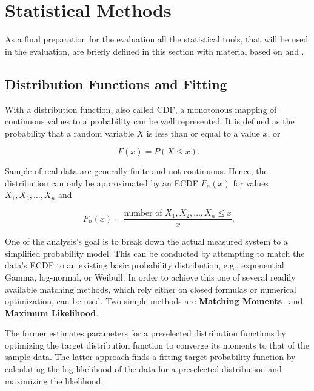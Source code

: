 \section{Statistical Methods}

As a final preparation for the evaluation all the statistical tools, that will be used in the evaluation, are briefly defined in this section with material based on \cite{field2012discovering} and \cite{Knuth:1997:ACP:270146}.


\subsection{Distribution Functions and Fitting}

With a distribution function, also called \gls{CDF}, a monotonous mapping of continuous values to a probability can be well represented. It is defined as the probability that a random variable $X$ is less than or equal to a value $x$, or

\begin{equation}
	\phantom{.} F(x) = P(X\leq x)\text{.}
\end{equation}

Sample of real data are generally finite and not continuous. Hence, the distribution can only be approximated by an \gls{ECDF} $F_n(x)$ for values $X_1, X_2, \ldots , X_n$ and

\begin{equation}
	\phantom{.}F_n(x) = \frac{\text{number of }X_1, X_2, \ldots , X_n \leq x}{x}\text{.}
\end{equation}

One of the analysis's goal is to break down the actual measured system to a simplified probability model. This can be conducted by attempting to match the data's \gls{ECDF} to an existing basic probability distribution, e.g., exponential Gamma, log-normal, or Weibull. In order to achieve this one of several readily available matching methods, which rely either on closed formulas or numerical optimization, can be used. Two simple methods are \textbf{Matching Moments}~\cite[pp.~99-143]{vose2000risk} and \textbf{Maximum Likelihood}.

The former estimates parameters for a preselected distribution functions by optimizing the target distribution function to converge its moments to that of the sample data. The latter approach finds a fitting target probability function by calculating the log-likelihood of the data for a preselected distribution and maximizing the likelihood.

